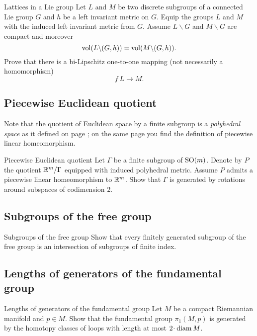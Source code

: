 \begin{pr}{}{Lattices in a Lie group}\label{Boys and girls in a Lie group}
Let $L$ and $M$ be two discrete subgroups
of a connected Lie group $G$ and $h$ be a left
invariant metric on $G$.
Equip the groups $L$ and $M$ 
with the induced left invariant metric from $G$.
Assume $L\backslash G$ and $M\backslash G$ are compact and moreover
$$\operatorname{\rm vol}(L\backslash (G,h))
=
\operatorname{\rm vol}(M\backslash (G,h)).$$
Prove that there is a bi-Lipschitz one-to-one mapping
(not necessarily a homomorphism)
\[f\:L
\to
M.\]
\end{pr}


\subsection*{Piecewise Euclidean quotient}

Note that the quotient of Euclidean space by a finite subgroup is a {}\emph{polyhedral space} as it defined on page \pageref{piecewise linear map};
on the same page you find the definition of piecewise linear homeomorphism.


\begin{pr}{}{Piecewise Euclidean quotient}\label{Piecewise Euclidean quotient}
Let $\Gamma$ be a finite subgroup of $\mathrm{SO}(m)$.
Denote by $P$ the quotient $\mathbb{R}^m/\Gamma$ equipped with induced
polyhedral metric.
Assume $P$ admits a piecewise linear homeomorphism to $\mathbb{R}^m$.
Show that $\Gamma$ is generated by rotations  around subspaces of codimension $2$.
\end{pr}

\subsection*{Subgroups of the free group}

\begin{pr}{}{Subgroups of the free group}\label{Subgroups of free group} 
Show that every finitely generated subgroup of the free group 
is an intersection of subgroups of finite index.
\end{pr}

\subsection*{Lengths of generators of the fundamental group\easy}

\begin{pr}{\easy}{Lengths of generators of the fundamental group}\label{Lengths of generators of the fundamental group}
Let $M$ be a compact Riemannian manifold and $p\in M$.
Show that the fundamental group $\pi_1(M,p)$
is generated by the homotopy classes of loops with length at most $2\cdot\diam M$.
\end{pr}

